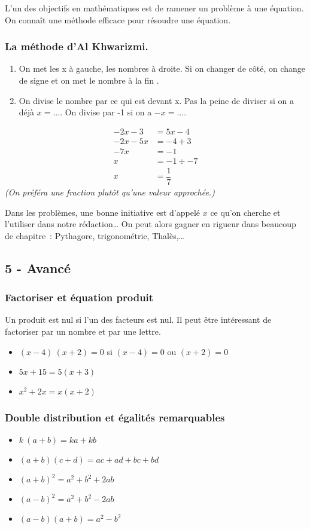 \documentclass[11pt]{article}
\begin{document}
L’un des objectifs en mathématiques est de ramener un problème à une équation. On connaît une méthode efficace pour résoudre une équation.
\begin{multicols}{2}
\subsubsection*{La méthode d’Al Khwarizmi.}
\begin{enumerate}
\item On met les x à gauche, les nombres à droite. Si on changer de côté, on change de signe et on met le nombre \fg à la fin \og.
\item On divise le nombre par ce qui est devant x. Pas la peine de diviser si on a déjà $x= ...$. On divise par -1 si on a $-x = ...$.
\end{enumerate}

\begin{align*}
-2x - 3 &= 5x - 4 \\
-2x -5x &= -4 + 3 \\
-7x &= -1  \\
x &= -1 \div -7 \\
x &= \dfrac{1}{7}
\end{align*}
\textit{(On préféra une fraction plutôt qu'une valeur approchée.)}
\end{multicols}
 
Dans les problèmes, une bonne initiative est d’appelé $x$ ce qu’on cherche et l’utiliser dans notre rédaction… On peut alors gagner en rigueur dans beaucoup de chapitre : Pythagore, trigonométrie, Thalès,…

\subsection*{5 - Avancé}

\subsubsection*{Factoriser et équation produit}

Un produit est nul si l’un des facteurs est nul. Il peut être intéressant de factoriser par un nombre et par une lettre.

 \begin{itemize}
  \item $(x-4) ~ (x + 2) = 0 $ si  $(x-4) = 0 $ ou $(x + 2) = 0 $
  \item $5x + 15 = 5(x + 3)$
  \item $x^2 + 2x = x(x + 2)$ 
\end{itemize} 

\subsubsection*{Double distribution et égalités remarquables}

 \begin{itemize}
  \item $k ~ (a + b) = ka + kb$
  \item $(a + b)(c + d) = ac + ad + bc + bd$
  \item $(a + b)^2 = a^2 + b^2 + 2 ab$
  \item $(a - b)^2 = a^2 + b^2 - 2 ab$
  \item $(a - b)(a + b) = a^2 - b^2$
\end{itemize} 
\end{document}
